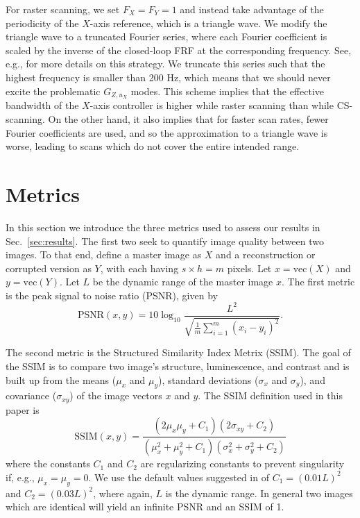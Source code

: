 \documentclass[journal]{IEEEtran}
\begin{document}
For raster scanning, we set $F_X=F_Y=1$ and instead take advantage of
the periodicity of the $X$-axis reference, which is a triangle wave.
We modify the triangle wave to a truncated Fourier series, where each
Fourier coefficient is scaled by the inverse of the closed-loop FRF at
the corresponding frequency. See, e.g., \cite{clayton_review_2009} for
more details on this strategy. We truncate this series such that the
highest frequency is smaller than 200 Hz, which means that we should
never excite the problematic $G_{Z,u_X}$ modes. This scheme implies
that the effective bandwidth of the $X$-axis controller is higher
while raster scanning than while CS-scanning. On the other hand, it
also implies that for faster scan rates, fewer Fourier
coefficients are used, and so the approximation to a triangle wave is
worse, leading to scans which do not cover the entire intended range.

\section{Metrics}\label{sec:rdi}
In this section we introduce the three metrics used to assess our
results in Sec.~\ref{sec:results}. The first two seek to quantify image quality between two images.
To that end, define a master image as $X$ and a reconstruction or corrupted version
as $Y$, with each having $s\times h=m$ pixels. Let $x=\textrm{vec}(X)$
and $y=\textrm{vec}(Y)$. Let $L$ be the dynamic range of the master
image $x$. The first metric is the peak signal to noise ratio (PSNR), given by
\begin{equation*}
  \text{PSNR}(x,y) = 10\log_{10}\frac{L^2}
  {\sqrt{\frac{1}{m} \sum_{i=1}^{m}( x_{i} - y_{i})^2 }}.
\end{equation*}

The second metric is the Structured Similarity Index Metrix (SSIM).
The goal of the SSIM is to compare two image's structure,
luminescence, and contrast and is built up from the means ($\mu_x$ and
$\mu_y$), standard deviations ($\sigma_x$ and $\sigma_y$), and
covariance ($\sigma_{xy}$) of the image vectors $x$ and $y$. The SSIM definition used in this paper is
\begin{equation*}
  \text{SSIM}(x,y) = \frac{(2\mu_x\mu_y + C_1)(2\sigma_{xy}+C_2)}
  {(\mu_x^2 + \mu_y^2 + C_1)(\sigma_x^2 + \sigma_y^2 + C_2)}
\end{equation*}
where the constants $C_1$ and $C_2$ are regularizing constants to
prevent singularity if, e.g., $\mu_x=\mu_y=0$. We use the default
values suggested in \cite{wang_image_2004} of $C_1=(0.01L)^2$ and
${C_2=(0.03L)^2}$, where again, $L$ is the dynamic range. In general
two images which are identical will yield an infinite PSNR and an SSIM
of 1.
\end{document}
